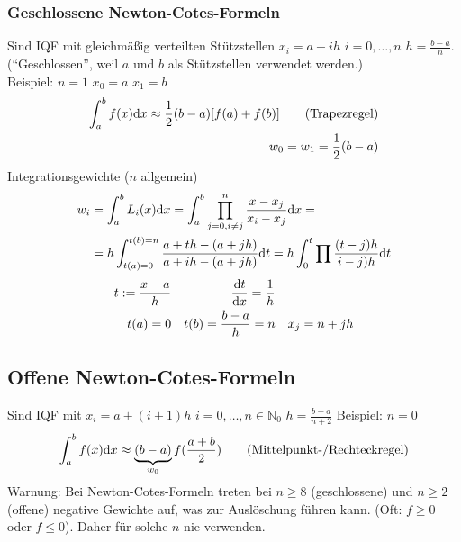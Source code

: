 \subsubsection{Geschlossene Newton-Cotes-Formeln}
Sind IQF mit gleichmäßig verteilten Stützstellen $x_i = a + ih$ $i=0,\ldots,n$ $h=\frac{b-a}{n}$.
(``Geschlossen'', weil $a$ und $b$ als Stützstellen verwendet werden.)\\
Beispiel: $n=1$ $x_0=a$ $x_1=b$
\begin{align*}
  \int_a^b f(x) \mathrm{d}x \approx \frac{1}{2} (b-a)[f(a)+f(b)] \tag{Trapezregel}\\
  w_0 = w_1 = \frac{1}{2} (b-a)
\end{align*}
Integrationsgewichte ($n$ allgemein)
\begin{align*}
  w_i &= \int_a^b L_i(x) \mathrm{d}x = \int_a^b \prod_{j=0,i\neq j}^n \frac{x-x_j}{x_i - x_j}\mathrm{d}x =\\
  &= h \int_{t(a) = 0}^{t(b) = n} \frac{a + th - (a+jh)}{a + ih - (a+jh)} \mathrm{d}t = h \int_0^t \prod \frac{(t-j)h}{i-j)h} \mathrm{d}t
\end{align*}
\begin{align*}
  t:= \frac{x-a}{h} && \frac{\mathrm{d}t}{\mathrm{d}x} = \frac{1}{h} \\
  t(a)=0 && t(b)=\frac{b-a}{h}=n && x_j = n + jh
\end{align*}

\subsection{Offene Newton-Cotes-Formeln}
Sind IQF mit $x_i = a + (i+1)h$ $i=0,\ldots,n \in \mathbb{N}_0$
$h=\frac{b-a}{n+2}$
Beispiel: $n=0$
\begin{align*}
  \int_a^b f(x) \mathrm{d}x \approx \underbrace{(b-a)}_{w_0} f(\frac{a+b}{2}) \tag{Mittelpunkt-/Rechteckregel}
\end{align*}
Warnung: Bei Newton-Cotes-Formeln treten bei $n \geq 8$ (geschlossene) und $n \geq 2$ (offene)
negative Gewichte auf, was zur Auslöschung führen kann. (Oft: $f \geq 0$ oder $f \leq 0$).
Daher für solche $n$ nie verwenden.

